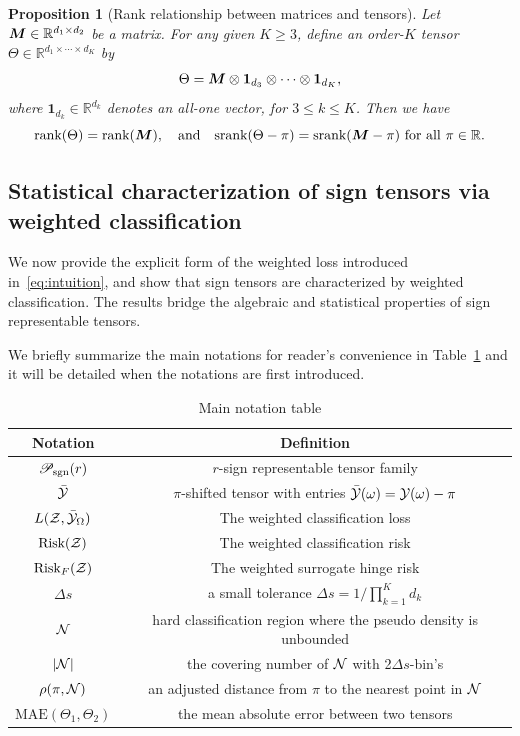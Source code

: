 \documentclass[twoside,11pt]{article}
\theoremstyle{plain}
\newtheorem{prop}{Proposition}
\theoremstyle{definition}
\def\srank{\textup{srank}}
\def\rank{\textup{rank}}
\def\caliP{\mathscr{P}_{\textup{sgn}}}
\def\risk{\textup{Risk}}
\begin{document}
\begin{prop}[Rank relationship between matrices and tensors]\label{prop:connection}Let $\bm M\in\mathbb{R}^{d_1\times d_2}$ be a matrix. For any given $K\geq 3$, define an order-$K$ tensor $\Theta\in\mathbb{R}^{d_1\times \cdots \times d_K}$ by
\[
\Theta=\bm M\otimes \mathbf{1}_{d_3}\otimes \cdots \otimes \mathbf{1}_{d_K},
\] 
where $\mathbf{1}_{d_k}\in\mathbb{R}^{d_k}$ denotes an all-one vector, for $3\leq k\leq K$. Then we have
\[
\rank(\Theta)=\rank(\mM),\quad \text{and}\quad \srank(\Theta-\pi)=\srank(\mM-\pi) \ \text{for all $\pi\in\mathbb{R}$}.
\] 
\end{prop}





\subsection{Statistical characterization of sign tensors via weighted classification}\label{sec:identifiability}
We now provide the explicit form of the weighted loss introduced in~\eqref{eq:intuition}, and show that sign tensors are characterized by weighted classification. The results bridge the algebraic and statistical properties of sign representable tensors.
 
 
We briefly summarize the main notations for reader's convenience  in Table~\ref{tb:not} and it will be detailed when the notations are first introduced.
\begin{table}[h]
    \centering
    \begin{tabular}{c c}
    \toprule
        Notation &  Definition \\\midrule
        $\caliP(r)$ & $r$-sign representable tensor family\\
        $\bar {\mathcal{Y}}$ & $\pi$-shifted  tensor with entries $\bar{\mathcal{Y}}(\omega) = \mathcal{Y}(\omega)-\pi$\\
         $L(\mathcal{Z},\bar{\mathcal{Y}}_\Omega)$& The weighted classification loss \\
         $\text{Risk}(\mathcal{Z})$ & The weighted classification risk \\
         $\risk_F(\tZ)$ & The weighted surrogate hinge risk\\
         $\Delta s$ & a small tolerance $\Delta s = 1/\prod_{k=1}^K d_k$\\
         $\mathcal{N}$ & hard classification region where the pseudo density is unbounded\\
         $|\mathcal{N}|$ & the covering number of $\mathcal{N}$ with  2$\Delta s$-bin's\\
         $\rho(\pi,\mathcal{N})$ & an adjusted distance from $\pi$ to the nearest point in $\mathcal{N}$\\
         $\text{MAE}(\Theta_1,\Theta_2)$ & the mean absolute error between two tensors\\
         \bottomrule
    \end{tabular}
    \caption{Main notation table }
    \label{tb:not}
\end{table}
 
\end{document}
